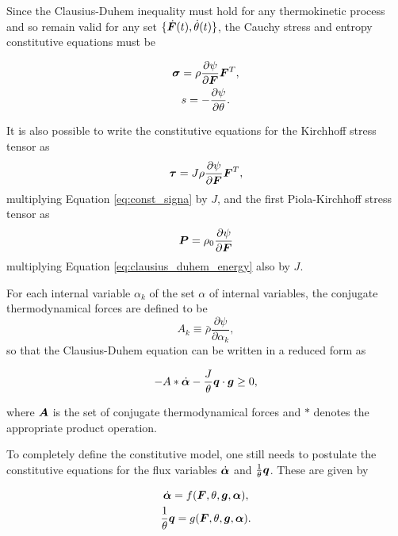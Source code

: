 Since the Clausius-Duhem inequality must hold for any thermokinetic process and so remain valid for any set $\{\dot{\bm{F}}(t),\dot \theta(t)\}$, the Cauchy stress and entropy constitutive equations must be
\begin{highlight}[innertopmargin=-5pt]
    \begin{gather}
        \bm{\sigma} = \rho \frac{\partial \psi}{\partial \bm{F}}\bm{F}^T, \label{eq:const_signa}\\
        s = -\frac{\partial \psi}{\partial \theta}.
    \end{gather}
\end{highlight}

It is also possible to write the constitutive equations for the Kirchhoff stress tensor as
\begin{equation}
    \bm{\tau} = J\rho \frac{\partial \psi}{\partial \bm{F}}\bm{F}^T,
\end{equation}
multiplying Equation \eqref{eq:const_signa} by $J$, and the first Piola-Kirchhoff stress tensor as
\begin{equation}
    \bm{P} = \rho_0 \frac{\partial \psi}{\partial \bm{F}}
\end{equation}
multiplying Equation \eqref{eq:clausius_duhem_energy} also by $J$.

For each internal variable $\alpha_k$ of the set $\alpha$ of internal variables, the conjugate thermodynamical forces are defined to be
\begin{equation}
    A_k\equiv \bar\rho \frac{\partial \psi}{\partial \alpha_k},
\end{equation}
so that the Clausius-Duhem equation can be written in a reduced form as
\begin{highlight}
    \begin{equation}
        -A*\dot{\bm{\alpha}} - \frac{J}{\theta}\bm{q}\cdot \bm{g}\geq 0,
    \end{equation}
\end{highlight}
where $\bm{A}$ is the set of conjugate thermodynamical forces and \(*\) denotes the appropriate product operation.

To completely define the constitutive model, one still needs to postulate the constitutive equations for the flux variables $\dot{\bm{\alpha}}$ and $\frac{1}{\theta}\bm{q}$.
These are given by
\begin{highlight}[innertopmargin=-5pt]
            \begin{gather}     \dot{\bm{\alpha}} = f(\bm{F}, \theta, \bm{g}, \bm{\alpha}),\\      \frac{1}{\theta}\bm{q} = g(\bm{F}, \theta, \bm{g}, \bm{\alpha}).
            \end{gather}
\end{highlight}

